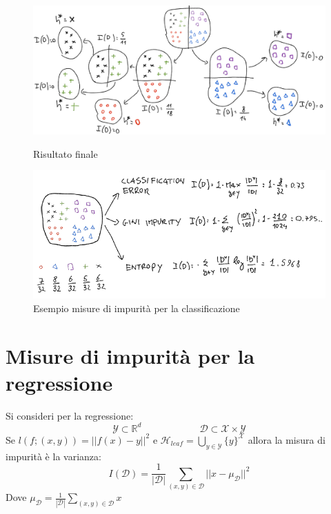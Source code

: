 	\begin{figure}
		\centering
		\begin{minipage}{.5\textwidth}
			\centering
			\includegraphics[width=1\linewidth]{imgs/chapter5/img11}
			\caption{Risultato finale}
			\label{fig:chapter05-11}
		\end{minipage}%
		\begin{minipage}{.5\textwidth}
			\centering
			\includegraphics[width=1\linewidth]{imgs/chapter5/img5}
			\caption{Esempio misure di impurit\`a per la classificazione}
			\label{fig:chapter05-05}
		\end{minipage}
	\end{figure}

\section{Misure di impurit\`a per la regressione}
Si consideri per la regressione:
$$\mathcal{Y}\subset\mathbb{R}^d\qquad\qquad\qquad\mathcal{D}\subset\mathcal{X}\times\mathcal{Y}$$
Se $l(f;(x,y))=||f(x)-y||^2$ e $\mathcal{H}_{leaf} = \bigcup\limits_{y\in\mathcal{Y}}\{y\}^\mathcal{X}$ allora la misura di impurit\`a \`e la varianza:
$$I(\mathcal{D})=\dfrac{1}{|\mathcal{D}|}\sum\limits_{(x,y)\in\mathcal{D}}||x-\mu_\mathcal{D}||^2$$
Dove $\mu_\mathcal{D} = \frac{1}{|\mathcal{D}|}\sum\limits_{(x,y)\in\mathcal{D}}x$

